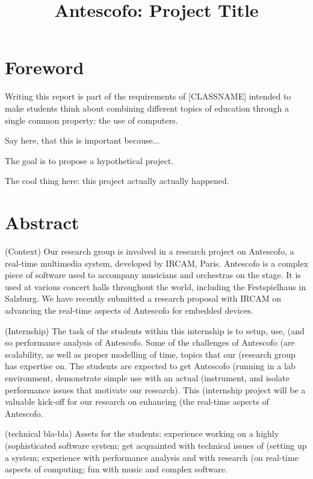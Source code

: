 \documentclass[onecolumn,nocopyrightspace,preprint]{sigplanconf}
\title{Antescofo: Project Title}
\begin{document}
\maketitle

\section*{Foreword} 
Writing this report is part of the requirements of [CLASSNAME] intended to
make students think about combining different topics of education through
a single common property: the use of computers.

Say here, that this is important because...

The goal is to propose a hypothetical project.

The cool thing here: this project actually actually happened.

\section*{Abstract} 

(Context) Our research group is involved in a research project on Antescofo, a
real-time multimedia system, developed by IRCAM, Paris. Antescofo is a complex
piece of software used to accompany musicians and orchestras on the stage. It
is used at various concert halls throughout the world, including the
Festspielhaus in Salzburg. We have recently submitted a research proposal with
IRCAM on advancing the real-time aspects of Antescofo for embedded devices.

(Internship) The task of the students within this internship is to setup, use,
(and so performance analysis of Antescofo. Some of the challenges of Antescofo
(are scalability, as well as proper modelling of time, topics that our
(research group has expertise on. The students are expected to get Antescofo
(running in a lab environment, demonstrate simple use with an actual
(instrument, and isolate performance issues that motivate our research). This
(internship project will be a valuable kick-off for our research on enhancing
(the real-time aspects of Antescofo.

(technical bla-bla) Assets for the students: experience working on a highly
(sophisticated software system; get acquainted with technical issues of
(setting up a system; experience with performance analysis and with research
(on real-time aspects of computing; fun with music and complex software.
\end{document}
